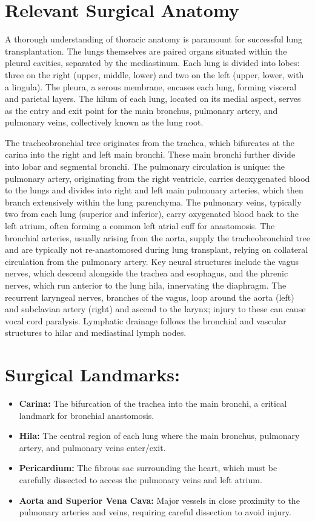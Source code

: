 \section*{Relevant Surgical Anatomy}
A thorough understanding of thoracic anatomy is paramount for successful lung transplantation. The lungs themselves are paired organs situated within the pleural cavities, separated by the mediastinum. Each lung is divided into lobes: three on the right (upper, middle, lower) and two on the left (upper, lower, with a lingula). The pleura, a serous membrane, encases each lung, forming visceral and parietal layers. The hilum of each lung, located on its medial aspect, serves as the entry and exit point for the main bronchus, pulmonary artery, and pulmonary veins, collectively known as the lung root.

The tracheobronchial tree originates from the trachea, which bifurcates at the carina into the right and left main bronchi. These main bronchi further divide into lobar and segmental bronchi. The pulmonary circulation is unique: the pulmonary artery, originating from the right ventricle, carries deoxygenated blood to the lungs and divides into right and left main pulmonary arteries, which then branch extensively within the lung parenchyma. The pulmonary veins, typically two from each lung (superior and inferior), carry oxygenated blood back to the left atrium, often forming a common left atrial cuff for anastomosis. The bronchial arteries, usually arising from the aorta, supply the tracheobronchial tree and are typically not re-anastomosed during lung transplant, relying on collateral circulation from the pulmonary artery. Key neural structures include the vagus nerves, which descend alongside the trachea and esophagus, and the phrenic nerves, which run anterior to the lung hila, innervating the diaphragm. The recurrent laryngeal nerves, branches of the vagus, loop around the aorta (left) and subclavian artery (right) and ascend to the larynx; injury to these can cause vocal cord paralysis. Lymphatic drainage follows the bronchial and vascular structures to hilar and mediastinal lymph nodes.

\section{Surgical Landmarks:}
\begin{itemize}
  \item \textbf{Carina:} The bifurcation of the trachea into the main bronchi, a critical landmark for bronchial anastomosis.
  \item \textbf{Hila:} The central region of each lung where the main bronchus, pulmonary artery, and pulmonary veins enter/exit.
  \item \textbf{Pericardium:} The fibrous sac surrounding the heart, which must be carefully dissected to access the pulmonary veins and left atrium.
  \item \textbf{Aorta and Superior Vena Cava:} Major vessels in close proximity to the pulmonary arteries and veins, requiring careful dissection to avoid injury.
\end{itemize}

